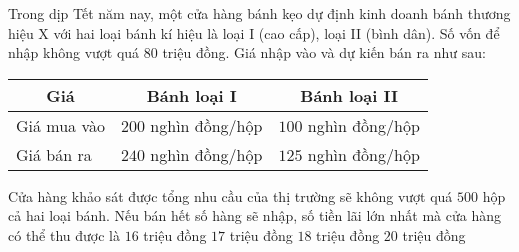 \begin{ex}%
	Trong dịp Tết năm nay, một cửa hàng bánh kẹo dự định kinh doanh bánh thương hiệu X với hai loại bánh kí hiệu là loại I (cao cấp), loại II (bình dân). Số vốn để nhập không vượt quá $80$ triệu đồng. Giá nhập vào và dự kiến bán ra như sau:
	\begin{center}
		\begin{tabular}{|l|c|c|}
			\hline \multicolumn{1}{|c|}{ Giá } & Bánh loại I & Bánh loại II \\
			\hline Giá mua vào & $200$ nghìn đồng/hộp & $100$ nghìn đồng/hộp \\
			\hline Giá bán ra & $240$ nghìn đồng/hộp & $125$ nghìn đồng/hộp \\
			\hline
		\end{tabular}
	\end{center}
	Cửa hàng khảo sát được tổng nhu cầu của thị trường sẽ không vượt quá $500$ hộp cả hai loại bánh. Nếu bán hết số hàng sẽ nhập, số tiền lãi lớn nhất mà cửa hàng có thể thu được là
	\choice
	{$16$ triệu đồng}
	{\True $17$ triệu đồng}
	{$18$ triệu đồng}
	{$20$ triệu đồng}
\end{ex}

